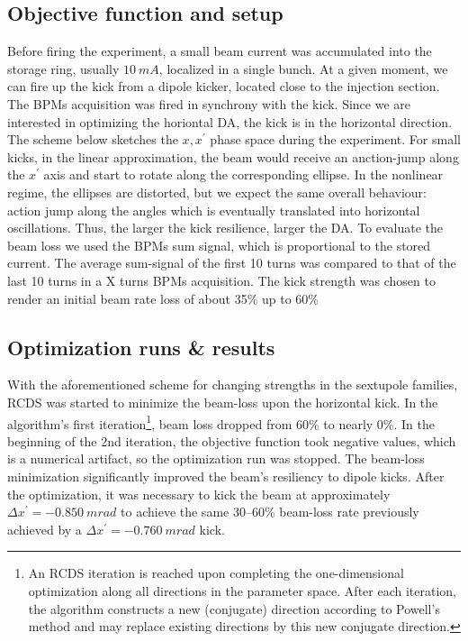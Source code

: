 \subsection{Objective function and setup}
Before firing the experiment, a small beam current was accumulated into the storage ring, usually $10~\unit{mA}$, localized in a single bunch. At a given moment, we can fire up the kick from a dipole kicker, located close to the injection section. The BPMs acquisition was fired in synchrony with the kick. Since we are interested in optimizing the horiontal DA, the kick is in the horizontal direction. The scheme below sketches the $x,x^\prime$ phase space during the experiment. For small kicks, in the linear approximation, the beam would receive an anction-jump along the $x^\prime$ axis and start to rotate along the corresponding ellipse. In the nonlinear regime, the ellipses are distorted, but we expect the same overall behaviour: action jump along the angles which is eventually translated into horizontal oscillations. Thus, the larger the kick resilience, larger the DA.
To evaluate the beam loss we used the BPMs sum signal, which is proportional to the stored current. The average sum-signal of the first 10 turns was compared to that of the last 10 turns in a X turns BPMs acquisition. The kick strength was chosen to render an initial beam rate loss of about 35\% up to 60\%
\subsection{Optimization runs \& results}
With the aforementioned scheme for changing strengths in the sextupole families, RCDS was started to minimize the beam-loss upon the horizontal kick. In the algorithm's first iteration\footnote{An RCDS iteration is reached upon completing the one-dimensional optimization along all directions in the parameter space. After each iteration, the algorithm constructs a new (conjugate) direction according to Powell's method and may replace existing directions by this new conjugate direction.}, beam loss dropped from 60\% to nearly 0\%. In the beginning of the 2nd iteration, the objective function took negative values, which is a numerical artifact, so the optimization run was stopped. The beam-loss minimization significantly improved the beam's resiliency to dipole kicks. After the optimization, it was necessary to kick the beam at approximately $\Delta x^\prime=-0.850~\unit{m rad}$ to achieve the same  30--60\% beam-loss rate previously achieved by a $\Delta x^\prime=-0.760~\unit{m rad}$ kick.

